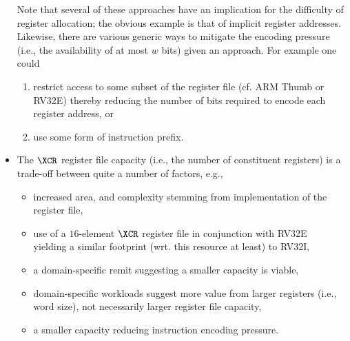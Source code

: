 \begin{itemize}
      \noindent
      Note that several of these approaches have an implication for the
      difficulty of register allocation; the obvious example is that of
      implicit register addresses.  Likewise, there are various generic
      ways to mitigate the encoding pressure (i.e., the availability of 
      at most $w$ bits) given an approach.  For example one could
      
      \begin{enumerate}
      \item restrict access to some subset of the register file 
            (cf. ARM Thumb or RV32E) 
            thereby reducing the number of bits required to encode each  
            register address,
            or
      \item use some form of instruction prefix.
      \end{enumerate}

\item The $\XCR$ register file capacity (i.e., the number of constituent
      registers) is a trade-off between quite a number of factors, e.g.,

      \begin{itemize}
      \item increased area, and complexity stemming from implementation
            of the register file,
      \item use of a $16$-element $\XCR$ register file in conjunction
            with RV32E~\cite[Section 3]{SCARV:RV:ISA:I:17} yielding a 
            similar footprint (wrt. this resource at least) to RV32I,
      \item a domain-specific remit suggesting a smaller capacity is 
            viable,
      \item   domain-specific workloads suggest more value from larger 
            registers (i.e., word size), not necessarily larger register
            file capacity,
      \item a smaller capacity reducing instruction encoding pressure.
      \end{itemize}

\end{itemize}

